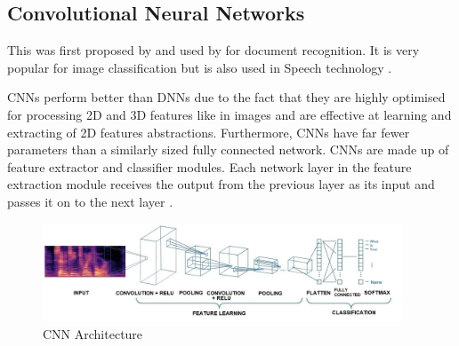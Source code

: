 \subsection{Convolutional Neural Networks}
\label{sub:CNN}
This was first proposed by \cite{fukushima_neocognitron_1988} and used by \cite{lecun_gradient-based_1998} for document recognition. It is very popular for image classification but is also used in Speech technology \cite{abdel-hamid_exploring_2013} \cite{ghahremani_acoustic_2016} \cite{dua_developing_2022}. 

CNNs perform better than DNNs due to the fact that they are highly optimised for processing 2D and 3D features like in images and are effective at learning and extracting of 2D features abstractions. Furthermore, CNNs have far fewer parameters than a similarly sized fully connected network. CNNs are made up of feature extractor and classifier modules. Each network layer in the feature extraction module receives the output from the previous layer as its input and passes it on to the next layer \cite{backstrom_introduction_2022}. %

\begin{figure}[h!]
    \centering
    \includegraphics[width=0.95\textwidth]{img/CNN.jpg}
    \caption{CNN Architecture}
    \label{fig:cnn-arch}
\end{figure}

